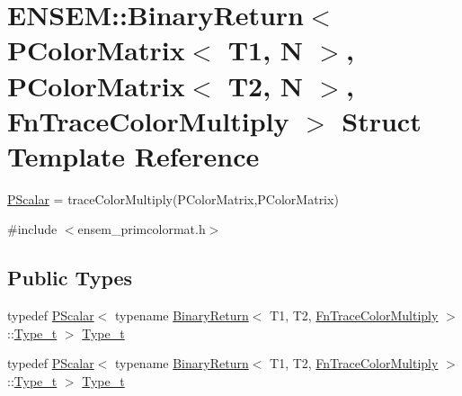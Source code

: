 \hypertarget{structENSEM_1_1BinaryReturn_3_01PColorMatrix_3_01T1_00_01N_01_4_00_01PColorMatrix_3_01T2_00_01N_a47a4c46ca38f78d2b12e618a0cca27a}{}\section{E\+N\+S\+EM\+:\+:Binary\+Return$<$ P\+Color\+Matrix$<$ T1, N $>$, P\+Color\+Matrix$<$ T2, N $>$, Fn\+Trace\+Color\+Multiply $>$ Struct Template Reference}
\label{structENSEM_1_1BinaryReturn_3_01PColorMatrix_3_01T1_00_01N_01_4_00_01PColorMatrix_3_01T2_00_01N_a47a4c46ca38f78d2b12e618a0cca27a}


\mbox{\hyperlink{classENSEM_1_1PScalar}{P\+Scalar}} = trace\+Color\+Multiply(\+P\+Color\+Matrix,\+P\+Color\+Matrix)  




{\ttfamily \#include $<$ensem\+\_\+primcolormat.\+h$>$}

\subsection*{Public Types}
\begin{DoxyCompactItemize}
\item 
typedef \mbox{\hyperlink{classENSEM_1_1PScalar}{P\+Scalar}}$<$ typename \mbox{\hyperlink{structENSEM_1_1BinaryReturn}{Binary\+Return}}$<$ T1, T2, \mbox{\hyperlink{structENSEM_1_1FnTraceColorMultiply}{Fn\+Trace\+Color\+Multiply}} $>$\+::\mbox{\hyperlink{structENSEM_1_1BinaryReturn_3_01PColorMatrix_3_01T1_00_01N_01_4_00_01PColorMatrix_3_01T2_00_01N_a47a4c46ca38f78d2b12e618a0cca27a_a2e75e25e722e5b033ed977551768c19c}{Type\+\_\+t}} $>$ \mbox{\hyperlink{structENSEM_1_1BinaryReturn_3_01PColorMatrix_3_01T1_00_01N_01_4_00_01PColorMatrix_3_01T2_00_01N_a47a4c46ca38f78d2b12e618a0cca27a_a2e75e25e722e5b033ed977551768c19c}{Type\+\_\+t}}
\item 
typedef \mbox{\hyperlink{classENSEM_1_1PScalar}{P\+Scalar}}$<$ typename \mbox{\hyperlink{structENSEM_1_1BinaryReturn}{Binary\+Return}}$<$ T1, T2, \mbox{\hyperlink{structENSEM_1_1FnTraceColorMultiply}{Fn\+Trace\+Color\+Multiply}} $>$\+::\mbox{\hyperlink{structENSEM_1_1BinaryReturn_3_01PColorMatrix_3_01T1_00_01N_01_4_00_01PColorMatrix_3_01T2_00_01N_a47a4c46ca38f78d2b12e618a0cca27a_a2e75e25e722e5b033ed977551768c19c}{Type\+\_\+t}} $>$ \mbox{\hyperlink{structENSEM_1_1BinaryReturn_3_01PColorMatrix_3_01T1_00_01N_01_4_00_01PColorMatrix_3_01T2_00_01N_a47a4c46ca38f78d2b12e618a0cca27a_a2e75e25e722e5b033ed977551768c19c}{Type\+\_\+t}}
\end{DoxyCompactItemize}


